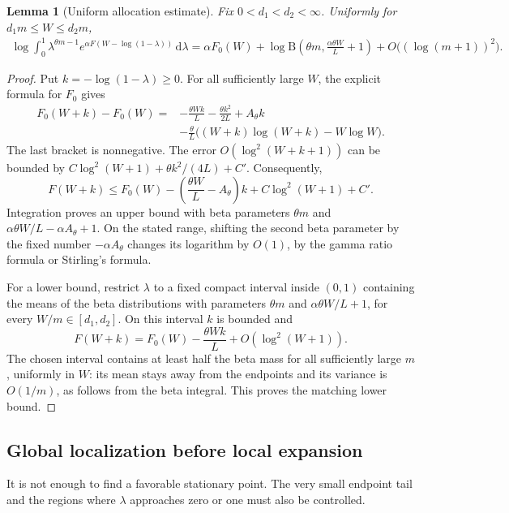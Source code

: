 \documentclass[11pt,a4paper]{article}
\numberwithin{equation}{section}
\newtheorem{lemma}[lemma]{Lemma}
\theoremstyle{definition}\newaliascnt{definition}{theorem}
\theoremstyle{remark}\newaliascnt{remark}{theorem}
\newcommand{\dd}{\,\mathrm d}
\newcommand{\Bf}{\mathrm B}
\begin{document}
\begin{lemma}[Uniform allocation estimate]
\label{lem:allocation-integral}
Fix $0<d_1<d_2<\infty$. Uniformly for $d_1m\le W\le d_2m$,
\begin{align}
 \log\int_0^1\lambda^{\theta m-1}
 e^{\alpha F(W-\log(1-\lambda))}\dd\lambda
  =\alpha F_0(W)
    +\log\Bf\left(\theta m,\frac{\alpha\theta W}{L}+1\right)
    +O\bigl((\log(m+1))^2\bigr).
 \label{eq:allocation-beta}
\end{align}
\end{lemma}
\begin{proof}
Put $k=-\log(1-\lambda)\ge0$. For all sufficiently large $W$, the explicit
formula for $F_0$ gives
\begin{align*}
 F_0(W+k)-F_0(W)
  ={}&-\frac{\theta Wk}{L}-\frac{\theta k^2}{2L}+A_\theta k\\
 &-\frac{\theta}{L}\bigl((W+k)\log(W+k)-W\log W\bigr).
\end{align*}
The last bracket is nonnegative. The error $O(\log^2(W+k+1))$ can be bounded
by $C\log^2(W+1)+\theta k^2/(4L)+C'$. Consequently,
\begin{equation}
 F(W+k)\le F_0(W)
    -\left(\frac{\theta W}{L}-A_\theta\right)k
    +C\log^2(W+1)+C'.
 \label{eq:allocation-upper}
\end{equation}
Integration proves an upper bound with beta parameters
$\theta m$ and $\alpha\theta W/L-\alpha A_\theta+1$.
On the stated range, shifting the second beta parameter by the fixed number
$-\alpha A_\theta$ changes its logarithm by $O(1)$, by the gamma ratio
formula or Stirling's formula.

For a lower bound, restrict $\lambda$ to a fixed compact interval inside
$(0,1)$ containing the means of the beta distributions with parameters
$\theta m$ and $\alpha\theta W/L+1$, for every $W/m\in[d_1,d_2]$.
On this interval $k$ is bounded and
\[
 F(W+k)=F_0(W)-\frac{\theta Wk}{L}+O(\log^2(W+1)).
\]
The chosen interval contains at least half the beta mass for all sufficiently
large $m$, uniformly in $W$: its mean stays away from the endpoints and its
variance is $O(1/m)$, as follows from the beta integral. This proves the
matching lower bound.
\end{proof}

\subsection{Global localization before local expansion}
It is not enough to find a favorable stationary point. The very small
endpoint tail and the regions where $\lambda$ approaches zero or one must
also be controlled.
\end{document}
